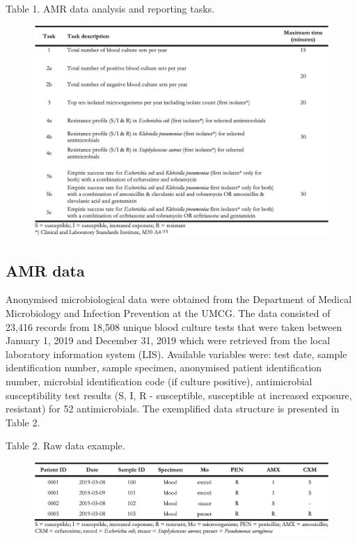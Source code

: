 \documentclass[
]{book}
\begin{document}
Table 1. AMR data analysis and reporting tasks.

\begin{figure}

{\centering \includegraphics[width=1\linewidth]{images/06-t01} 

}

\end{figure}

\hypertarget{amr-data}{%
\subsection{AMR data}\label{amr-data}}

Anonymised microbiological data were obtained from the Department of Medical Microbiology and Infection Prevention at the UMCG. The data consisted of 23,416 records from 18,508 unique blood culture tests that were taken between January 1, 2019 and December 31, 2019 which were retrieved from the local laboratory information system (LIS). Available variables were: test date, sample identification number, sample specimen, anonymised patient identification number, microbial identification code (if culture positive), antimicrobial susceptibility test results (S, I, R - susceptible, susceptible at increased exposure, resistant) for 52 antimicrobials. The exemplified data structure is presented in Table 2.

Table 2. Raw data example.

\begin{figure}

{\centering \includegraphics[width=1\linewidth]{images/06-t02} 

}

\end{figure}
\end{document}

